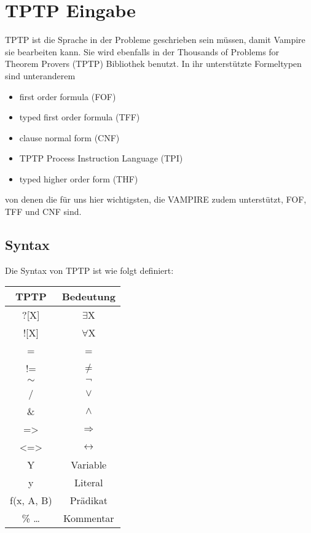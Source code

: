 \documentclass{acm_proc_article-sp-german}
\begin{document}
\section{TPTP Eingabe}
\label{sec:input}

TPTP ist die Sprache in der Probleme geschrieben sein müssen, damit Vampire sie bearbeiten kann. Sie wird ebenfalls in der Thousands of Problems for Theorem Provers (TPTP) Bibliothek benutzt.
In ihr unterstützte Formeltypen sind unteranderem 
\begin{itemize}
	\item first order formula (FOF)
	\item typed first order formula (TFF)
	\item clause normal form (CNF)
	\item TPTP Process Instruction Language  (TPI)
	\item typed higher order form (THF)
\end{itemize}
von denen die für uns hier wichtigsten, die VAMPIRE zudem unterstützt, FOF, TFF und CNF sind.

\subsection{Syntax}
\label{subsec:syntax}
Die Syntax von TPTP ist wie folgt definiert:

\begin{tabular}{|c|c|}
	\hline TPTP & Bedeutung \\ 
	\hline ?[X] & $\exists$X \\
	\hline ![X] & $\forall$X \\
	\hline = & = \\
	\hline != & $\neq$ \\
	\hline $\sim$ & $\lnot$ \\
	\hline / & $\lor$ \\
	\hline \& & $\land$ \\
	\hline => & $\Rightarrow$ \\
	\hline <=> & $\leftrightarrow$ \\
	\hline Y & Variable \\
	\hline y & Literal \\
	\hline f(x, A, B) & Prädikat \\
	\hline \% \dots & Kommentar \\
	\hline
\end{tabular} 
\end{document}
